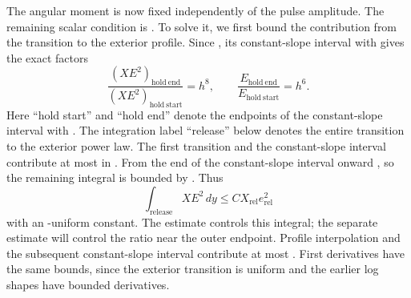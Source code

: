 The angular moment is now fixed independently of the pulse amplitude. The remaining scalar
condition is . To solve it, we first bound the contribution from
the transition to the exterior profile. Since
, its constant-slope interval with
 gives the exact factors
\begin{equation}
\frac{(XE^2)_{\mathrm{hold\ end}}}{(XE^2)_{\mathrm{hold\ start}}}=h^8,
\qquad
\frac{E_{\mathrm{hold\ end}}}{E_{\mathrm{hold\ start}}}=h^6.
\tag{A.17}\label{eq:A.17}
\end{equation}
Here ``hold start'' and ``hold end'' denote the endpoints of the constant-slope interval with
. The integration label ``release'' below denotes the entire transition
to the exterior power law. The first transition and the constant-slope interval contribute at most
 in
. From the end of the constant-slope interval onward
, so the remaining integral is bounded by
. Thus
\begin{equation}
\int_{\mathrm{release}}XE^2\,dy\le CX_{\mathrm{rel}}e_{\mathrm{rel}}^2
\tag{A.18}\label{eq:A.18}
\end{equation}
with an -uniform constant. The  estimate
controls this integral; the separate  estimate will control the ratio
 near the outer endpoint. Profile interpolation and the
subsequent constant-slope interval contribute at most
. First
 derivatives have the same bounds, since the exterior transition is
uniform and the earlier log shapes have bounded derivatives.
\par
